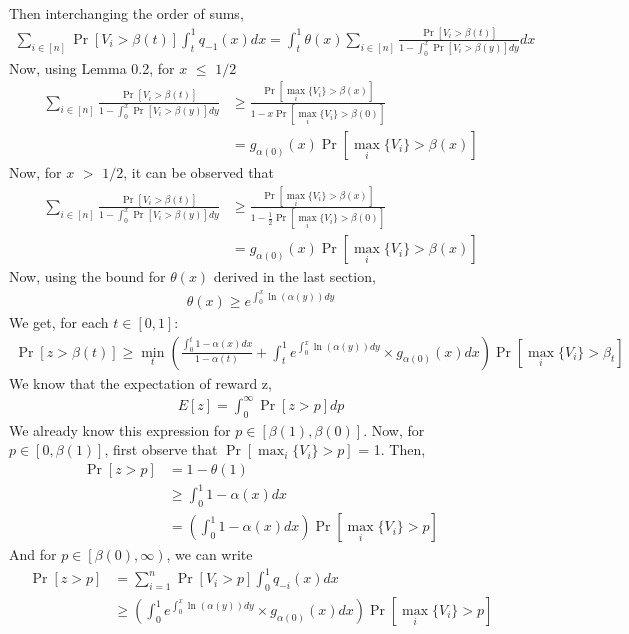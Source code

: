 \documentclass[10pt, letterpaper, twoside]{article}
\begin{document}
	Then interchanging the order of sums,
	\begin{align*}
	\sum_{i \in [n]} \Pr[V_{i} > \beta(t)] \int_{t}^{1} q_{-1}(x) dx = \int_{t}^{1} \theta(x) \sum_{i \in [n]} \frac{\Pr[V_{i} > \beta(t)]}{1 - \int_{0}^{x} \Pr[V_{i} > \beta(y)] dy} dx
	\end{align*}
	Now, using Lemma 0.2, for $x$ $\leq$ $1/2$
	\begin{align*}
	\sum_{i \in [n]} \frac{\Pr[V_{i} > \beta(t)]}{1 - \int_{0}^{x} \Pr[V_{i} > \beta(y)] dy} &\geq \frac{\Pr[\max_{i} \{V_{i}\} > \beta(x)]}{1-x\Pr[\max_{i} \{V_{i}\} > \beta(0)]}\\
	&= g_{\alpha(0)} (x) \Pr[\max_{i} \{V_{i}\} > \beta(x)]
	\end{align*}
	Now, for $x$ $>$ $1/2$, it can be observed that \\
	\begin{align*}
	\sum_{i \in [n]} \frac{\Pr[V_{i} > \beta(t)]}{1 - \int_{0}^{x} \Pr[V_{i} > \beta(y)] dy} &\geq \frac{\Pr[\max_{i} \{V_{i}\} > \beta(x)]}{1-\frac{1}{2}\Pr[\max_{i} \{V_{i}\} > \beta(0)]} \\
	&= g_{\alpha(0)} (x) \Pr[\max_{i} \{V_{i}\} > \beta(x)]
	\end{align*}
	Now, using the bound for $\theta(x)$ derived in the last section,
	\begin{align*}
	\theta(x) \geq e^{\int_{0}^{x} \ln(\alpha(y)) dy}
	\end{align*}
	We get, for each $t \in [0,1]$:
	\begin{align*}
	\Pr[z > \beta(t)] \geq \min_{t}\left(\frac{\int_{0}^{t} 1 - \alpha(x) dx}{1-\alpha(t)} + \int_{t}^{1} e^{\int_{0}^{x} \ln(\alpha(y)) dy} \times g_{\alpha(0)}(x) dx \right) \Pr[\max_{i} \{V_{i}\} > \beta_{t}]
	\end{align*}
	We know that the expectation of reward z,
	\begin{align*}
	E[z] = \int_{0}^{\infty} \Pr[z > p] dp
	\end{align*}
	We already know this expression for $p \in [\beta(1),\beta(0)]$. Now, for $p \in [0,\beta(1)]$, first observe that $\Pr[\max_{i} \{V_{i}\} > p]$ = 1. Then,
	\begin{align*}
	\Pr[z > p] &= 1 - \theta(1)\\
	&\geq \int_{0}^{1} 1 - \alpha(x) dx \\
	&=\left(\int_{0}^{1} 1 - \alpha(x) dx \right) \Pr[\max_{i} \{V_{i}\} > p]
	\end{align*}
	And for $p \in\left [\beta(0),\infty\right)$, we can write
	\begin{align*}
	\Pr[z > p] &= \sum_{i=1}^{n} \Pr[V_{i} > p] \int_{0}^{1} q_{-i} (x) dx\\
	&\geq \left(\int_{0}^{1} e^{\int_{0}^{x} \ln(\alpha(y)) dy} \times g_{\alpha(0)}(x) dx \right) \Pr[\max_{i} \{V_{i}\} > p]
	\end{align*}
\end{document}
